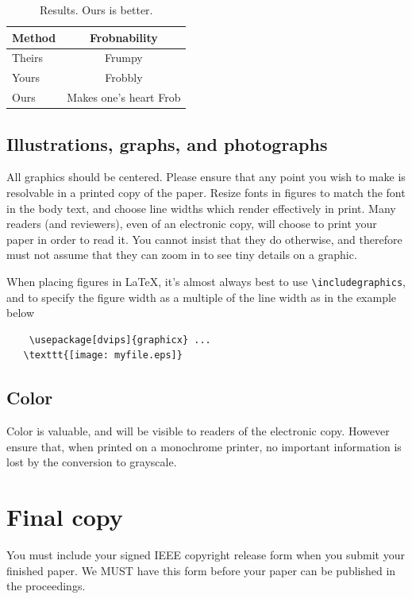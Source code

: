 \documentclass[10pt,twocolumn,letterpaper]{article}
\begin{document}
\begin{table}
  \begin{center}
    \begin{tabular}{|l|c|}
      \hline
      Method & Frobnability \\
      \hline\hline
      Theirs & Frumpy \\
      Yours & Frobbly \\
      Ours & Makes one's heart Frob\\
      \hline
    \end{tabular}
  \end{center}
  \caption{Results.   Ours is better.}
\end{table}

\subsection{Illustrations, graphs, and photographs}

All graphics should be centered.  Please ensure that any point you
wish to make is resolvable in a printed copy of the paper.  Resize
fonts in figures to match the font in the body text, and choose line
widths which render effectively in print.  Many readers (and
reviewers), even of an electronic copy, will choose to print your
paper in order to read it.  You cannot insist that they do otherwise,
and therefore must not assume that they can zoom in to see tiny
details on a graphic.

When placing figures in \LaTeX, it's almost always best to use
\verb+\includegraphics+, and to specify the figure width as a multiple
of the line width as in the example below {\small\begin{verbatim}
    \usepackage[dvips]{graphicx} ...
   \texttt{[image: myfile.eps]}
\end{verbatim}
}


\subsection{Color}

Color is valuable, and will be visible to readers of the electronic
copy.  However ensure that, when printed on a monochrome printer, no
important information is lost by the conversion to grayscale.

\section{Final copy}

You must include your signed IEEE copyright release form when you
submit your finished paper. We MUST have this form before your paper
can be published in the proceedings.


{\small   }
\end{document}
